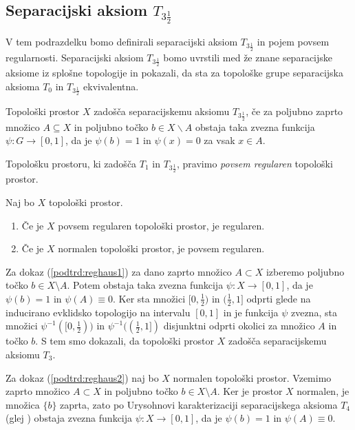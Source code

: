 \documentclass[mat1]{fmfdelo}
\begin{document}
\subsection{Separacijski aksiom $T_{3 \frac{1}{2}}$}
V tem podrazdelku bomo definirali separacijski aksiom $T_{3 \frac{1}{2}}$ in pojem povsem regularnosti. Separacijski aksiom $T_{3 \frac{1}{2}}$ bomo uvrstili med že znane separacijske aksiome iz splošne topologije in pokazali, da sta za topološke grupe separacijska aksioma $T_0$ in $T_{3 \frac{1}{2}}$ ekvivalentna.
\begin{definicija}
	Topološki prostor $X$ zadošča separacijskemu aksiomu $T_{3 \frac{1}{2}}$, če za poljubno zaprto množico $A \subseteq X$ in poljubno točko $b \in X\backslash A$ obstaja taka zvezna funkcija $\psi\colon G \to [0, 1]$, da je $\psi (b) = 1$ in $\psi (x) = 0$ za vsak $x \in A$.
\end{definicija}

\begin{definicija}
	Topološku prostoru, ki zadošča $T_1$ in $T_{3 \frac{1}{2}}$, pravimo \emph{povsem regularen} topološki prostor.
\end{definicija}

\begin{trditev}\label{pos:reghaus}
Naj bo $X$ topološki prostor.
\begin{enumerate}
\item Če je $X$ povsem regularen topološki prostor, je regularen.\label{podtrd:reghaus1}
\item Če je $X$ normalen topološki prostor, je povsem regularen.\label{podtrd:reghaus2}
\end{enumerate}
\end{trditev}

\begin{dokaz}
Za dokaz (\ref{podtrd:reghaus1}) za dano zaprto množico $A \subset X$ izberemo poljubno točko $b \in X \setminus A$. Potem obstaja taka zvezna funkcija $\psi\colon X \to [0, 1]$, da je $\psi(b) = 1$ in $\psi(A) \equiv 0$.
Ker sta množici $[0, \frac{1}{2})$ in $(\frac{1}{2}, 1]$ odprti glede na inducirano evklidsko topologijo na intervalu $[0, 1]$ in je funkcija $\psi$ zvezna, sta množici $\psi^{-1}([0, \frac{1}{2}))$ in $\psi^{-1}((\frac{1}{2}, 1])$ disjunktni odprti okolici za množico $A$ in točko $b$.
S tem smo dokazali, da topološki prostor $X$ zadošča separacijskemu aksiomu $T_3$.

Za dokaz (\ref{podtrd:reghaus2}) naj bo $X$ normalen topološki prostor. 
Vzemimo zaprto množico $A \subset X$ in poljubno točko $b \in X \setminus A$.
Ker je prostor $X$ normalen, je množica $\lbrace b \rbrace$ zaprta,
zato po Urysohnovi karakterizaciji separacijskega aksioma $T_4$ (glej \cite{bib:top}) obstaja zvezna funkcija $\psi\colon X \to [0, 1]$, da je $\psi(b) = 1$ in $\psi(A) \equiv 0$.
\end{dokaz}
\end{document}
